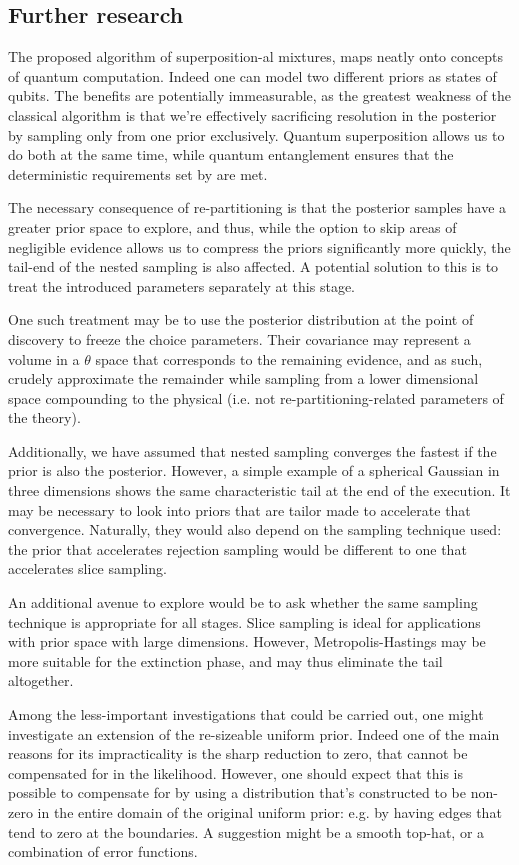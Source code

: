 \documentclass[usenatbib]{mnras}
\begin{document}
\subsection{Further research}
\label{sec:org78d9ce1}
The proposed algorithm of superposition-al mixtures, maps neatly
onto concepts of quantum computation. Indeed one can model two
different priors as states of qubits. The benefits are potentially
immeasurable, as the greatest weakness of the classical algorithm
is that we're effectively sacrificing resolution in the posterior
by sampling only from one prior exclusively. Quantum superposition
allows us to do both at the same time, while quantum entanglement
ensures that the deterministic requirements set by
\citeauthor{Skilling2006} are met.

The necessary consequence of re-partitioning is that the posterior
samples have a greater prior space to explore, and thus, while the
option to skip areas of negligible evidence allows us to compress
the priors significantly more quickly, the tail-end of the nested
sampling is also affected. A potential solution to this is to treat
the introduced parameters separately at this stage.

One such treatment may be to use the posterior distribution at the
point of discovery to freeze the choice parameters. Their
covariance may represent a volume in a \(\theta\) space that
corresponds to the remaining evidence, and as such, crudely
approximate the remainder while sampling from a lower dimensional
space compounding to the physical (i.e. not re-partitioning-related
parameters of the theory).

Additionally, we have assumed that nested sampling converges the
fastest if the prior is also the posterior. However, a simple
example of a spherical Gaussian in three dimensions shows the same
characteristic tail at the end of the execution. It may be
necessary to look into priors that are tailor made to accelerate
that convergence. Naturally, they would also depend on the sampling
technique used: the prior that accelerates rejection sampling would
be different to one that accelerates slice sampling.

An additional avenue to explore would be to ask whether the same
sampling technique is appropriate for all stages. Slice sampling is
ideal for applications with prior space with large
dimensions. However, Metropolis-Hastings may be more suitable for
the extinction phase, and may thus eliminate the tail altogether.

Among the less-important investigations that could be carried out,
one might investigate an extension of the re-sizeable uniform
prior. Indeed one of the main reasons for its impracticality is the
sharp reduction to zero, that cannot be compensated for in the
likelihood. However, one should expect that this is possible to
compensate for by using a distribution that's constructed to be
non-zero in the entire domain of the original uniform prior:
e.g. by having edges that tend to zero at the boundaries. A
suggestion might be a smooth top-hat, or a combination of error
functions.
\end{document}
